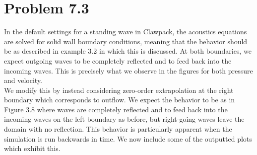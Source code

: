 \documentclass{article}
\begin{document}
\section{Problem 7.3}
In the default settings for a standing wave in Clawpack, the acoustics equations are solved for solid wall boundary conditions, meaning that the behavior should be as described in example 3.2 in which this is discussed. At both boundaries, we expect outgoing waves to be completely reflected and to feed back into the incoming waves. This is precisely what we observe in the figures for both pressure and velocity. \\
We modify this by instead considering zero-order extrapolation at the right boundary which corresponds to outflow. We expect the behavior to be as in Figure 3.8 where waves are completely reflected and to feed back into the incoming waves on the left boundary as before, but right-going waves leave the domain with no reflection. This behavior is particularly apparent when the simulation is run backwards in time. We now include some of the outputted plots which exhibit this.\\
\end{document}
